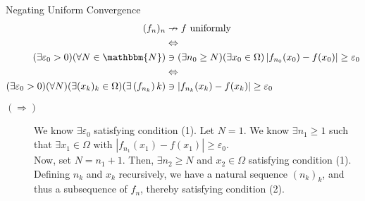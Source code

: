 \documentclass[10pt]{extarticle}
\newcommand{\N}{\mathbbm{N}}
\begin{document}
  \begin{problem}{Negating Uniform Convergence}
    \begin{align*}
      (f_n)_n &\nrightarrow f \text{ uniformly }\\
              &\Leftrightarrow\\
      (\exists \varepsilon_0 > 0)(\forall N\in\N)&\ni (\exists n_0 \geq N)(\exists x_0\in\Omega) \left|f_{n_0}(x_0) - f(x_0)\right| \geq \varepsilon_0\\
                                                 &\Leftrightarrow\\
      (\exists \varepsilon_0 > 0)(\forall N)(\exists (x_k)_k\in\Omega)(\exists \left(f_{n_k}\right)k) &\ni \left|f_{n_k}(x_k) - f(x_k)\right| \geq \varepsilon_0
    \end{align*}
    \tcblower
    \begin{description}
      \item[$(\Rightarrow)$] We know $\exists \varepsilon_0$ satisfying condition (1). Let $N = 1$. We know $\exists n_1 \geq 1$ such that $\exists x_1\in\Omega$ with $|f_{n_1}(x_1) - f(x_1)| \geq \varepsilon_0$.\\

        Now, set $N = n_1 + 1$. Then, $\exists n_2 \geq N$ and $x_2\in\Omega$ satisfying condition (1).\\

        Defining $n_k$ and $x_k$ recursively, we have a natural sequence $(n_k)_k$, and thus a subsequence of $f_n$, thereby satisfying condition (2).
    \end{description}
  \end{problem}
\end{document}
